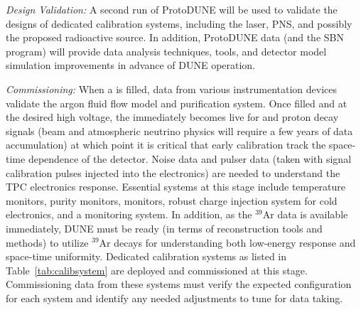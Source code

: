 \textit{Design Validation:} A second run of ProtoDUNE will be used to validate the designs of dedicated calibration systems, including the laser, PNS, and possibly the proposed radioactive source. In addition, ProtoDUNE data (and the SBN program) will provide data analysis techniques, tools, and detector model simulation improvements in advance of DUNE operation.


\textit{Commissioning:} When a  is filled, data from various instrumentation devices validate the argon fluid flow model and purification system. Once filled and at the desired high voltage, the  immediately becomes live for  and proton decay signals (beam and atmospheric neutrino physics will require a few years of data accumulation)
at which point it is critical that early calibration track the space-time dependence of the detector. Noise data 
and pulser data (taken with signal calibration pulses injected into the electronics) are needed to understand the TPC electronics response. Essential systems at this stage include temperature monitors, purity monitors,  monitors, robust  charge injection system for cold electronics, and a  monitoring system. 
In addition, as the $^{39}$Ar data is available immediately, DUNE must be ready (in terms of reconstruction tools and methods) to utilize $^{39}$Ar decays for understanding both low-energy response and space-time uniformity. 
Dedicated calibration systems as listed in Table~\ref{tab:calibsystem} are deployed and commissioned at this stage. Commissioning data from these systems must verify the expected configuration for each system and identify any needed adjustments to tune for data taking.

